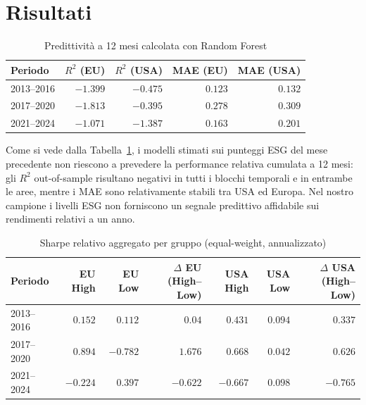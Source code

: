 \documentclass[12pt,a4paper]{article}
\begin{document}
\section{Risultati}

\begin{table}[H]
\centering
\caption{Predittività a 12 mesi calcolata con Random Forest}
\label{tab:rf}
\small
\begin{tabular}{lrrrr}
\toprule
\textbf{Periodo} & \textbf{$R^2$ (EU)} & \textbf{$R^2$ (USA)} & \textbf{MAE (EU)} & \textbf{MAE (USA)} \\
\midrule
2013--2016 & $-1.399$ & $-0.475$ & $0.123$ & $0.132$ \\
2017--2020 & $-1.813$ & $-0.395$ & $0.278$ & $0.309$ \\
2021--2024 & $-1.071$ & $-1.387$ & $0.163$ & $0.201$ \\
\bottomrule
\end{tabular}
\end{table}

Come si vede dalla Tabella~\ref{tab:rf}, i modelli stimati sui punteggi ESG del mese precedente non riescono a prevedere la performance relativa cumulata a 12 mesi: gli $R^2$ out-of-sample risultano negativi in tutti i blocchi temporali e in entrambe le aree, mentre i MAE sono relativamente stabili tra USA ed Europa. Nel nostro campione i livelli ESG non forniscono un segnale predittivo affidabile sui rendimenti relativi a un anno.

\begin{table}[H]
\centering
\caption{Sharpe relativo aggregato per gruppo (equal-weight, annualizzato)}
\label{tab:sharpe}
\small
\setlength{\tabcolsep}{4pt}
\begin{tabular}{lrrrrrr}
\toprule
\textbf{Periodo} & \textbf{EU High} & \textbf{EU Low} & \shortstack{$\Delta$ EU\\(High--Low)} & \textbf{USA High} & \textbf{USA Low} & \shortstack{$\Delta$ USA\\(High--Low)} \\
\midrule
2013--2016 & $0.152$ & $0.112$ & $0.04$ & $0.431$ & $0.094$ & $0.337$ \\
2017--2020 & $0.894$ & $-0.782$ & $1.676$ & $0.668$ & $0.042$ & $0.626$ \\
2021--2024 & $-0.224$ & $0.397$ & $-0.622$ & $-0.667$ & $0.098$ & $-0.765$ \\
\bottomrule
\end{tabular}
\end{table}
\end{document}
